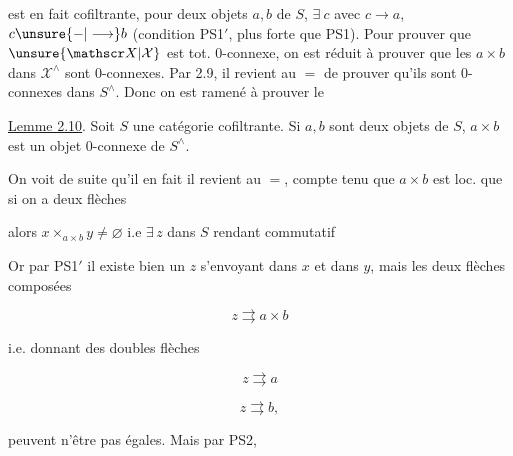 
est en fait cofiltrante,  pour deux objets $a,b$ de $S$, $\exists\ c$ avec $c\longrightarrow a$, $c\unsure{\mathbin{-}|\longrightarrow}b$ (condition PS1$'$, plus forte que PS1). Pour prouver que $\unsure{\mathscr X|\mathcal X}$ est tot. $0$-connexe, on est réduit à prouver  que les $a\times b$ dans $\mathscr X^\wedge$ sont $0$-connexes. Par 2.9, il revient au $=$ de prouver qu'ils sont $0$-connexes dans $S^\wedge$. Donc on est ramené à prouver le

\uline{Lemme 2.10}. Soit $S$ une catégorie cofiltrante. Si $a,b$ sont deux objets de $S$, $a\times b$ est un objet $0$-connexe de $S^\wedge$.

On voit de suite qu'il   en fait il revient au $=$, compte tenu que $a\times b$ est loc.   que si on a deux flèches



alors $x\times_{a\times b}y\ne\varnothing$ i.e $\exists\,z$ dans $S$ rendant commutatif


Or par PS1$'$ il existe bien un $z$ s'envoyant dans $x$ et dans $y$, mais les deux flèches composées

\[
z\rightrightarrows a\times b
\]

i.e. donnant des doubles flèches

\[
z\rightrightarrows a \tag*{$(*)$}
\]

\[
z\rightrightarrows b, \tag*{$(*')$}
\]

peuvent n'être pas égales. Mais par PS2,

